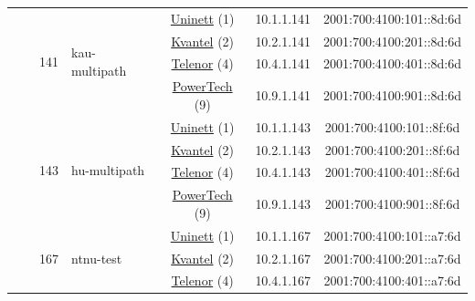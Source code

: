 \begin{small}
\begin{center}
\begin{longtable}{|c|c|c|c|c|c|c|c|}
  &  & \multirow{4}{*}{\tiny{141}} & \multicolumn{1}{|l|}{\multirow{4}{*}{\tiny{kau-multipath}}} & \multicolumn{2}{|c|}{\tiny{\href{https://www.uninett.no}{Uninett} (1)}} & \tiny{10.1.1.141} & \tiny{2001:700:4100:101::8d:6d} \\* \cline{5-5}\cline{6-6}\cline{7-7}\cline{8-8}
  &  &  &  & \multicolumn{2}{|c|}{\tiny{\href{http://kvantel.no}{Kvantel} (2)}} & \tiny{10.2.1.141} & \tiny{2001:700:4100:201::8d:6d} \\* \cline{5-5}\cline{6-6}\cline{7-7}\cline{8-8}
  &  &  &  & \multicolumn{2}{|c|}{\tiny{\href{https://www.telenor.no}{Telenor} (4)}} & \tiny{10.4.1.141} & \tiny{2001:700:4100:401::8d:6d} \\* \cline{5-5}\cline{6-6}\cline{7-7}\cline{8-8}
  &  &  &  & \multicolumn{2}{|c|}{\tiny{\href{http://www.powertech.no}{PowerTech} (9)}} & \tiny{10.9.1.141} & \tiny{2001:700:4100:901::8d:6d} \\* \cline{3-3}\cline{4-4}\cline{5-5}\cline{6-6}\cline{7-7}\cline{8-8}
  &  & \multirow{4}{*}{\tiny{143}} & \multicolumn{1}{|l|}{\multirow{4}{*}{\tiny{hu-multipath}}} & \multicolumn{2}{|c|}{\tiny{\href{https://www.uninett.no}{Uninett} (1)}} & \tiny{10.1.1.143} & \tiny{2001:700:4100:101::8f:6d} \\* \cline{5-5}\cline{6-6}\cline{7-7}\cline{8-8}
  &  &  &  & \multicolumn{2}{|c|}{\tiny{\href{http://kvantel.no}{Kvantel} (2)}} & \tiny{10.2.1.143} & \tiny{2001:700:4100:201::8f:6d} \\* \cline{5-5}\cline{6-6}\cline{7-7}\cline{8-8}
  &  &  &  & \multicolumn{2}{|c|}{\tiny{\href{https://www.telenor.no}{Telenor} (4)}} & \tiny{10.4.1.143} & \tiny{2001:700:4100:401::8f:6d} \\* \cline{5-5}\cline{6-6}\cline{7-7}\cline{8-8}
  &  &  &  & \multicolumn{2}{|c|}{\tiny{\href{http://www.powertech.no}{PowerTech} (9)}} & \tiny{10.9.1.143} & \tiny{2001:700:4100:901::8f:6d} \\* \cline{3-3}\cline{4-4}\cline{5-5}\cline{6-6}\cline{7-7}\cline{8-8}
  &  & \multirow{4}{*}{\tiny{167}} & \multicolumn{1}{|l|}{\multirow{4}{*}{\tiny{ntnu-test}}} & \multicolumn{2}{|c|}{\tiny{\href{https://www.uninett.no}{Uninett} (1)}} & \tiny{10.1.1.167} & \tiny{2001:700:4100:101::a7:6d} \\* \cline{5-5}\cline{6-6}\cline{7-7}\cline{8-8}
  &  &  &  & \multicolumn{2}{|c|}{\tiny{\href{http://kvantel.no}{Kvantel} (2)}} & \tiny{10.2.1.167} & \tiny{2001:700:4100:201::a7:6d} \\* \cline{5-5}\cline{6-6}\cline{7-7}\cline{8-8}
  &  &  &  & \multicolumn{2}{|c|}{\tiny{\href{https://www.telenor.no}{Telenor} (4)}} & \tiny{10.4.1.167} & \tiny{2001:700:4100:401::a7:6d} \\* \cline{5-5}\cline{6-6}\cline{7-7}\cline{8-8}

\end{longtable}
\end{center}
\end{small}
